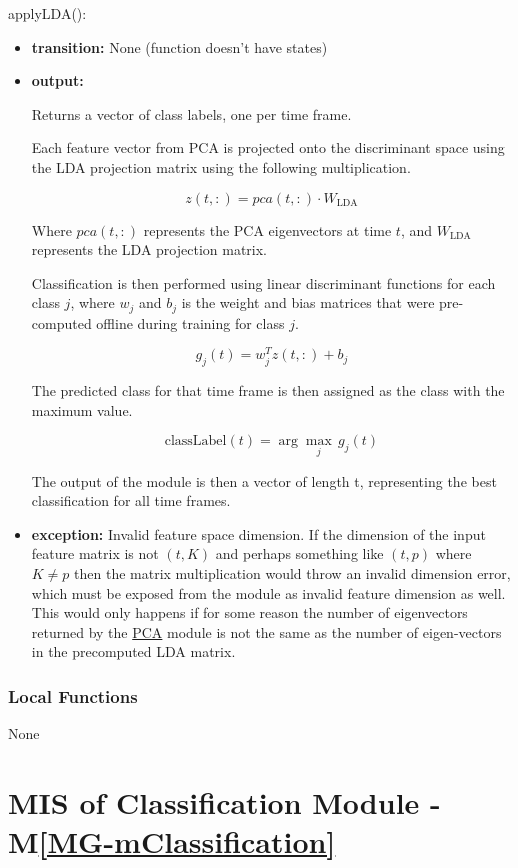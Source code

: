 \documentclass[12pt, titlepage]{article}
\newcommand{\mref}[1]{M\ref{#1}}
\begin{document}
\noindent applyLDA():
\begin{itemize}
\item \textbf{transition:} None (function doesn't have states)
\item \textbf{output:}

  Returns a vector of class labels, one per time frame. 

  Each feature vector from PCA is projected onto the discriminant space using
  the LDA projection matrix using the following multiplication. 

  \[
  z(t,:) = pca(t,:) \cdot W_{\text{LDA}}
  \]

  Where $pca(t,:)$ represents the PCA eigenvectors at time $t$, and
  $W_{\text{LDA}}$ represents the LDA projection matrix. 

  Classification is then performed using linear discriminant functions for each
  class $j$, where $w_j$ and $b_j$ is the weight and bias matrices that were
  pre-computed offline during training for class $j$. 

  \[
  g_j(t) = w_j^{T} z(t,:) + b_j
  \]

  The predicted class for that time frame is then assigned as the class with the
  maximum value. 

  \[
  \text{classLabel}(t) = \arg\max_{j} \, g_j(t)
  \]

  The output of the module is then a vector of length t, representing the best
  classification for all time frames. 


\item \textbf{exception:} Invalid feature space dimension. If the dimension of
  the input feature matrix is not $(t,K)$ and perhaps something like $(t,p)$
  where $K \neq p$ then the matrix multiplication would throw an invalid
  dimension error, which must be exposed from the module as invalid feature
  dimension as well. This would only happens if for some reason the number of
  eigenvectors returned by the \hyperref[MG-mPCA]{PCA} module is not the same as
  the number of eigen-vectors in the precomputed LDA matrix.
\end{itemize}

\subsubsection{Local Functions}

None

\newpage 

\section{MIS of Classification Module \label{mod:Classification} -
\mref{MG-mClassification}}
\end{document}
